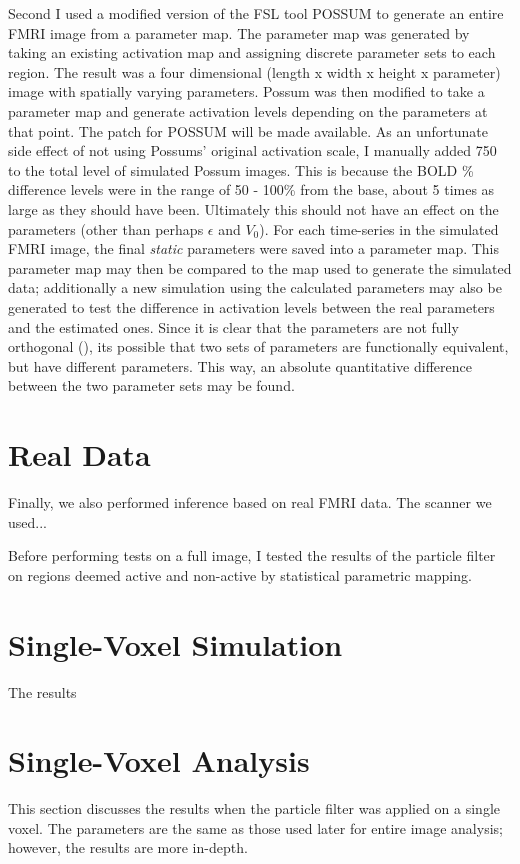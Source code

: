 Second I used a modified version of the FSL tool 
POSSUM to generate an entire FMRI image from a parameter map. The parameter map was generated
by taking an existing activation map and assigning discrete parameter sets to each region.
The result was a four dimensional (length x width
x height x parameter) image with spatially varying parameters. Possum was then modified
to take a parameter map and generate activation levels depending on the parameters at that
point. The patch for POSSUM will be made available. As an unfortunate side effect of 
not using Possums' original activation scale, I manually added 750 to the total level of
simulated Possum images. This is because the BOLD \% difference levels were in the range
of 50 - 100\% from the base, about 5 times as large as they should have been. Ultimately
this should not have an effect on the parameters (other than perhaps $\epsilon$ and $V_0$). 
For each time-series in the simulated FMRI image, the final \emph{static} parameters were saved
into a parameter map. This parameter map may then be compared to the map used to generate the 
simulated data; additionally a new simulation using the calculated parameters may also be 
generated to test the difference in activation levels between the real parameters and the
estimated ones. Since it is clear that the parameters are not fully orthogonal 
(\cite{Deneux2006}), its possible that two sets of parameters are functionally equivalent,
but have different parameters. This way, an absolute 
quantitative difference between the two parameter sets may be found.

\section{Real Data}
Finally, we also performed inference based on real FMRI data. The scanner we used...

Before performing tests on a full image, I tested the results of the particle filter
on regions deemed active and non-active by statistical parametric mapping. 
\section{Single-Voxel Simulation}
The results 

\section{Single-Voxel Analysis}
This section discusses the results when the particle filter was
applied on a single voxel. The parameters are the same as
those used later for entire image analysis; however, the results
are more in-depth. 

